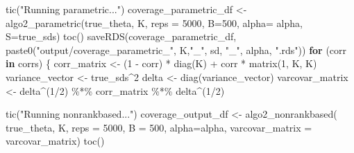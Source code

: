 \documentclass[
  12pt,
  a4paper,
]{article}
\newenvironment{Shaded}{\begin{snugshade}}{\end{snugshade}}
\newcommand{\AttributeTok}[1]{\textcolor[rgb]{0.00,0.34,0.68}{#1}}
\newcommand{\ControlFlowTok}[1]{\textcolor[rgb]{0.12,0.11,0.11}{\textbf{#1}}}
\newcommand{\DecValTok}[1]{\textcolor[rgb]{0.69,0.50,0.00}{#1}}
\newcommand{\FunctionTok}[1]{\textcolor[rgb]{0.39,0.29,0.61}{#1}}
\newcommand{\NormalTok}[1]{\textcolor[rgb]{0.12,0.11,0.11}{#1}}
\newcommand{\OtherTok}[1]{\textcolor[rgb]{0.00,0.43,0.16}{#1}}
\newcommand{\SpecialCharTok}[1]{\textcolor[rgb]{0.24,0.68,0.91}{#1}}
\newcommand{\StringTok}[1]{\textcolor[rgb]{0.75,0.01,0.01}{#1}}
\numberwithin{equation}{section}
\begin{document}
\begin{Shaded}
\begin{Highlighting}[]
      \FunctionTok{tic}\NormalTok{(}\StringTok{"Running parametric..."}\NormalTok{)}
\NormalTok{      coverage\_parametric\_df }\OtherTok{\textless{}{-}} \FunctionTok{algo2\_parametric}\NormalTok{(true\_theta,}
\NormalTok{                                                 K, }
                                                 \AttributeTok{reps =} \DecValTok{5000}\NormalTok{,}
                                                 \AttributeTok{B=}\DecValTok{500}\NormalTok{, }
                                                 \AttributeTok{alpha=}\NormalTok{ alpha,}
                                                 \AttributeTok{S=}\NormalTok{true\_sds)}
      \FunctionTok{toc}\NormalTok{()}
      \FunctionTok{saveRDS}\NormalTok{(coverage\_parametric\_df,  }\FunctionTok{paste0}\NormalTok{(}\StringTok{"output/coverage\_parametric\_"}\NormalTok{,}
\NormalTok{                                              K,}\StringTok{"\_"}\NormalTok{, sd, }\StringTok{"\_"}\NormalTok{, alpha, }\StringTok{".rds"}\NormalTok{))}
      \ControlFlowTok{for}\NormalTok{ (corr }\ControlFlowTok{in}\NormalTok{ corrs) \{}
\NormalTok{        corr\_matrix }\OtherTok{\textless{}{-}}\NormalTok{ (}\DecValTok{1} \SpecialCharTok{{-}}\NormalTok{ corr) }\SpecialCharTok{*} \FunctionTok{diag}\NormalTok{(K) }\SpecialCharTok{+}\NormalTok{ corr }\SpecialCharTok{*} \FunctionTok{matrix}\NormalTok{(}\DecValTok{1}\NormalTok{, K, K)}
\NormalTok{        variance\_vector }\OtherTok{\textless{}{-}}\NormalTok{ true\_sds}\SpecialCharTok{\^{}}\DecValTok{2}
\NormalTok{        delta }\OtherTok{\textless{}{-}} \FunctionTok{diag}\NormalTok{(variance\_vector)}
\NormalTok{        varcovar\_matrix }\OtherTok{\textless{}{-}}\NormalTok{ delta}\SpecialCharTok{\^{}}\NormalTok{(}\DecValTok{1}\SpecialCharTok{/}\DecValTok{2}\NormalTok{) }\SpecialCharTok{\%*\%}\NormalTok{ corr\_matrix }\SpecialCharTok{\%*\%}\NormalTok{ delta}\SpecialCharTok{\^{}}\NormalTok{(}\DecValTok{1}\SpecialCharTok{/}\DecValTok{2}\NormalTok{)}
        
        \FunctionTok{tic}\NormalTok{(}\StringTok{"Running nonrankbased..."}\NormalTok{)}
\NormalTok{        coverage\_output\_df }\OtherTok{\textless{}{-}} \FunctionTok{algo2\_nonrankbased}\NormalTok{(}
\NormalTok{          true\_theta,}
\NormalTok{          K, }
          \AttributeTok{reps =} \DecValTok{5000}\NormalTok{, }
          \AttributeTok{B =} \DecValTok{500}\NormalTok{, }
          \AttributeTok{alpha=}\NormalTok{alpha,}
          \AttributeTok{varcovar\_matrix =}\NormalTok{ varcovar\_matrix)}
        \FunctionTok{toc}\NormalTok{()}
        

\end{Highlighting}
\end{Shaded}
\end{document}
